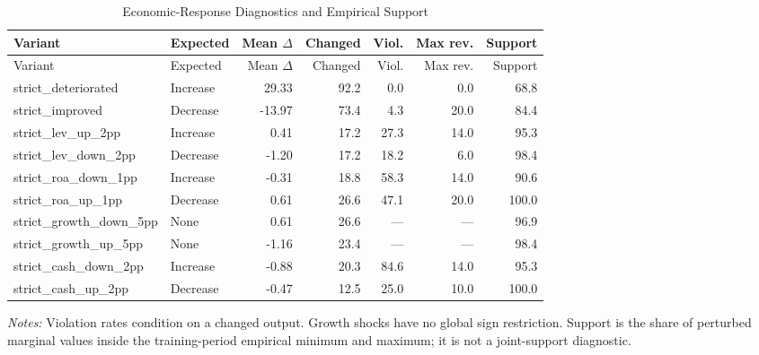 {\scriptsize\begin{longtable}{@{}p{}lrrrrr@{}}
\caption{Economic-Response Diagnostics and Empirical Support}\label{tab:a_economic}\\
\toprule Variant & Expected & Mean $\Delta$ & Changed & Viol. & Max rev. & Support \\
\midrule\endfirsthead
\toprule Variant & Expected & Mean $\Delta$ & Changed & Viol. & Max rev. & Support \\
\midrule\endhead
strict\_deteriorated & Increase & 29.33 & 92.2 & 0.0 & 0.0 & 68.8 \\
strict\_improved & Decrease & -13.97 & 73.4 & 4.3 & 20.0 & 84.4 \\
strict\_lev\_up\_2pp & Increase & 0.41 & 17.2 & 27.3 & 14.0 & 95.3 \\
strict\_lev\_down\_2pp & Decrease & -1.20 & 17.2 & 18.2 & 6.0 & 98.4 \\
strict\_roa\_down\_1pp & Increase & -0.31 & 18.8 & 58.3 & 14.0 & 90.6 \\
strict\_roa\_up\_1pp & Decrease & 0.61 & 26.6 & 47.1 & 20.0 & 100.0 \\
strict\_growth\_down\_5pp & None & 0.61 & 26.6 & --- & --- & 96.9 \\
strict\_growth\_up\_5pp & None & -1.16 & 23.4 & --- & --- & 98.4 \\
strict\_cash\_down\_2pp & Increase & -0.88 & 20.3 & 84.6 & 14.0 & 95.3 \\
strict\_cash\_up\_2pp & Decrease & -0.47 & 12.5 & 25.0 & 10.0 & 100.0 \\
\bottomrule\end{longtable}}
\begin{minipage}{\textwidth}\footnotesize\textit{Notes:} Violation rates condition on a changed output. Growth shocks have no global sign restriction. Support is the share of perturbed marginal values inside the training-period empirical minimum and maximum; it is not a joint-support diagnostic.\end{minipage}
